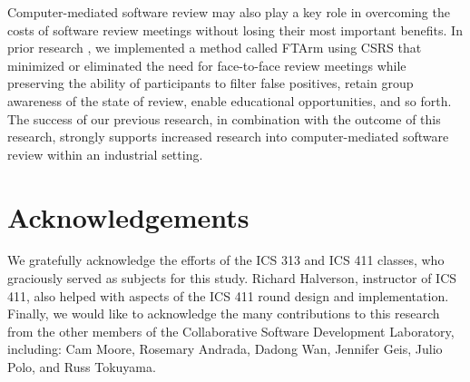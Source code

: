 Computer-mediated software review may also play a key role in overcoming
the costs of software review meetings without losing their most important
benefits. In prior research \cite{Johnson94}, we implemented a method
called FTArm using CSRS that minimized or eliminated the need for
face-to-face review meetings while preserving the ability of participants
to filter false positives, retain group awareness of the state of review,
enable educational opportunities, and so forth.  The success of our
previous research, in combination with the outcome of this research,
strongly supports increased research into computer-mediated
software review within an industrial setting. 


\section{Acknowledgements} 

We gratefully acknowledge the efforts of the ICS 313 and ICS 411 classes,
who graciously served as subjects for this study.  Richard Halverson,
instructor of ICS 411, also helped with aspects of the ICS 411 round design
and implementation.  Finally, we would like to acknowledge the many
contributions to this research from the other members of the Collaborative
Software Development Laboratory, including: Cam Moore, Rosemary Andrada,
Dadong Wan, Jennifer Geis, Julio Polo, and Russ Tokuyama.





